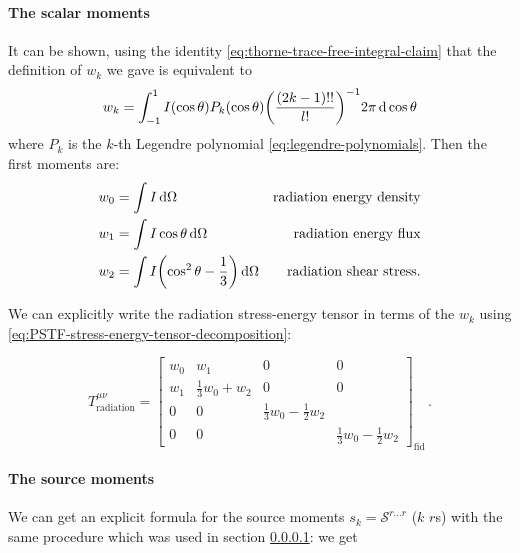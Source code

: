 \documentclass[main.tex]{subfiles}
\begin{document}
\paragraph{The scalar moments} \label{par:scalar-moments}

It can be shown, using the identity \eqref{eq:thorne-trace-free-integral-claim}  that the definition of \(w_k\) we gave is equivalent to
%
\begin{equation}
    w_k = \int_{-1}^1 I(\cos \theta) P_k(\cos \theta) \qty(\frac{(2k-1)!!}{l!})^{-1} 2 \pi\dd{\cos \theta}
\end{equation}
%
where \(P_k\) is the \(k\)-th Legendre polynomial \eqref{eq:legendre-polynomials}.
Then the first moments are:
%
\begin{subequations}
\begin{align}
  w_0 &= \int I \dd{\Omega} & \text{radiation energy density} \\
  w_1 &= \int I \cos \theta \dd{\Omega} & \text{radiation energy flux} \\
  w_2 &= \int I \qty(\cos^2 \theta - \frac{1}{3}) \dd{\Omega} & \text{radiation shear stress.}
\end{align}
\end{subequations}

We can explicitly write the radiation stress-energy tensor in terms of the \(w_k\) using \eqref{eq:PSTF-stress-energy-tensor-decomposition}:

\begin{equation} \label{eq:radiation-stress-energy-tensor-fiducial}
    T^{\mu\nu}_{\text{radiation}} = \begin{bmatrix}
    w_0   & w_1  & 0  & 0 \\
    w_1   & \frac{1}{3}w_0 + w_2  &  0  & 0 \\
      0 & 0  &  \frac{1}{3}w_0 -\frac{1}{2}w_2 &  \\
      0 & 0  &   & \frac{1}{3}w_0 -\frac{1}{2}w_2
  \end{bmatrix} _{\text{fid}}\,.
\end{equation}

\paragraph{The source moments}

We can get an explicit formula for the source moments \(s_k = \mathscr S ^{r\dots r}\) (\(k\) \(r\)s) with the same procedure which was used in section \ref{par:scalar-moments}:
we get
\end{document}
